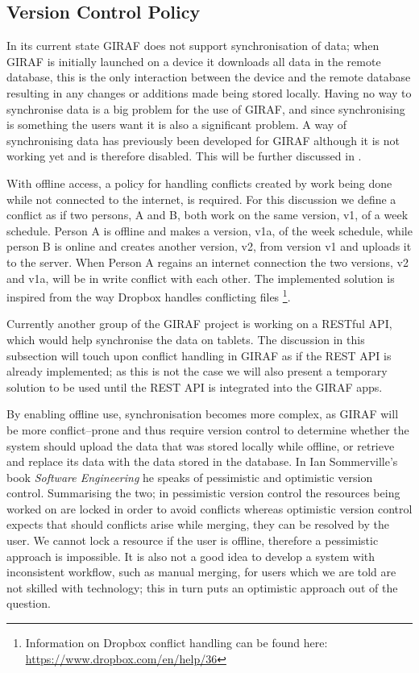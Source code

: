 \subsection{Version Control Policy}\label{ssec:policy}
In its current state GIRAF does not support synchronisation of data; when GIRAF is initially launched on a device it downloads all data in the remote database, this is the only interaction between the device and the remote database resulting in any changes or additions made being stored locally.
Having no way to synchronise data is a big problem for the use of GIRAF, and since synchronising is something the users want it is also a significant problem.
A way of synchronising data has previously been developed for GIRAF although it is not working yet and is therefore disabled.
This will be further discussed in .

With offline access, a policy for handling conflicts created by work being done while not connected to the internet, is required.
For this discussion we define a conflict as if two persons, A and B, both work on the same version, v1, of a week schedule.
Person A is offline and makes a version, v1a, of the week schedule, while person B is online and creates another version, v2, from version v1 and uploads it to the server.
When Person A regains an internet connection the two versions, v2 and v1a, will be in write conflict with each other.
The implemented solution is inspired from the way Dropbox handles conflicting files \footnote{Information on Dropbox conflict handling can be found here: \url{https://www.dropbox.com/en/help/36}}.

\bigskip
Currently another group of the GIRAF project is working on a RESTful API, which would help synchronise the data on tablets.
The discussion in this subsection will touch upon conflict handling in GIRAF as if the REST API is already implemented; as this is not the case we will also present a temporary solution to be used until the REST API is integrated into the GIRAF apps.

By enabling offline use, synchronisation becomes more complex, as GIRAF will be more conflict--prone and thus require version control to determine whether the system should upload the data that was stored locally while offline, or retrieve and replace its data with the data stored in the database.
In Ian Sommerville's book \textit{Software Engineering}\citep{SEBOOK} he speaks of pessimistic and optimistic version control.
Summarising the two; in pessimistic version control the resources being worked on are locked in order to avoid conflicts whereas optimistic version control expects that should conflicts arise while merging, they can be resolved by the user.
We cannot lock a resource if the user is offline, therefore a pessimistic approach is impossible.
It is also not a good idea to develop a system with inconsistent workflow, such as manual merging, for users which we are told are not skilled with technology; this in turn puts an optimistic approach out of the question.

